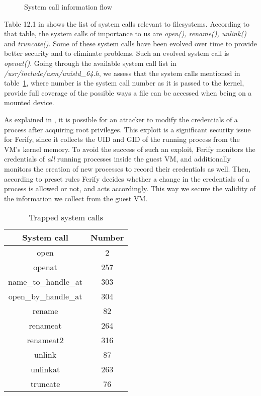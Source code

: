 \begin{figure}[ht]
	\centering
	
	\caption{System call information flow}
	\label{fig:syscall}
\end{figure}

\par Table 12.1 in \cite{linuxkernel} shows the list of system calls relevant to filesystems. According to that table, the system calls of importance to us are \emph{open(), rename(), unlink()} and \emph{truncate()}. Some of these system calls have been evolved over time to provide better security and to eliminate problems. Such an evolved system call is \emph{openat()}. Going through the available system call list in \emph{/usr/include/asm/unistd\_64.h}, we assess that the system calls mentioned in table~\ref{tbl:syscalls}, where number is the system call number as it is passed to the kernel, provide full coverage of the possible ways a file can be accessed when being on a mounted device. 

\par As explained in \cite{perla2010guide}, it is possible for an attacker to modify the credentials of a process after acquiring root privileges. This exploit is a significant security issue for Ferify, since it collects the \ac{UID} and \ac{GID} of the running process from the \ac{VM}'s kernel memory. To avoid the success of such an exploit, Ferify monitors the credentials of \emph{all} running processes inside the guest \ac{VM}, and additionally monitors the creation of new processes to record their credentials as well. Then, according to preset rules Ferify decides whether a change in the credentials of a process is allowed or not, and acts accordingly. This way we secure the validity of the information we collect from the guest \ac{VM}.


\begin{table}[ht]
	\centering
	\caption{Trapped system calls}
	\label{tbl:syscalls}
	\begin{tabular}{cc}
		\toprule
		System call & Number \\
		\hline
		open & 2 \\ 
		openat & 257 \\ 
		name\_to\_handle\_at & 303 \\
		open\_by\_handle\_at & 304 \\
		rename & 82 \\ 
		renameat & 264 \\  
		renameat2 & 316 \\ 
		unlink & 87 \\ 
		unlinkat & 263 \\
		truncate & 76 \\
		\bottomrule
	\end{tabular}	
\end{table}


